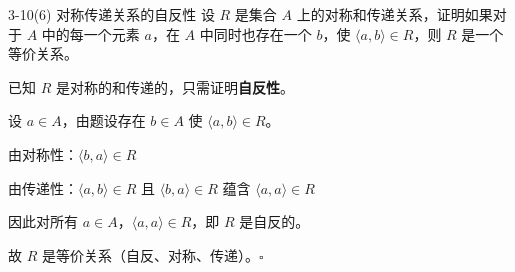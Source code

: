 \documentclass[11pt]{article}
\begin{document}
\begin{question}{3-10(6) 对称传递关系的自反性}
  设 $R$ 是集合 $A$ 上的对称和传递关系，证明如果对于 $A$ 中的每一个元素 $a$，在 $A$ 中同时也存在一个 $b$，使 $\langle a,b\rangle \in R$，则 $R$ 是一个等价关系。

  \begin{answer}
    已知 $R$ 是对称的和传递的，只需证明\textbf{自反性}。

    \vspace{0.5em}
    设 $a \in A$，由题设存在 $b \in A$ 使 $\langle a,b\rangle \in R$。

    由对称性：$\langle b,a\rangle \in R$

    由传递性：$\langle a,b\rangle \in R$ 且 $\langle b,a\rangle \in R$ 蕴含 $\langle a,a\rangle \in R$

    因此对所有 $a \in A$，$\langle a,a\rangle \in R$，即 $R$ 是自反的。

    \vspace{0.5em}
    故 $R$ 是等价关系（自反、对称、传递）。$\square$
  \end{answer}
\end{question}

\end{document}
